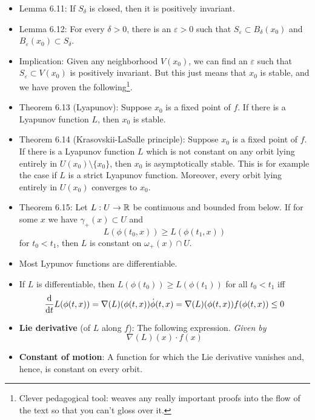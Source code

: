 \documentclass[../notes.tex]{subfiles}
\begin{document}
\begin{itemize}
    \item Lemma 6.11: If $S_\delta$ is closed, then it is positively invariant.
    \item Lemma 6.12: For every $\delta>0$, there is an $\varepsilon>0$ such that $S_\varepsilon\subset B_\delta(x_0)$ and $B_\varepsilon(x_0)\subset S_\delta$.
    \item Implication: Given any neighborhood $V(x_0)$, we can find an $\varepsilon$ such that $S_\varepsilon\subset V(x_0)$ is positively invariant. But this just means that $x_0$ is stable, and we have proven the following\footnote{Clever pedagogical tool: \textcite{bib:Teschl} weaves any really important proofs into the flow of the text so that you can't gloss over it.}.
    \item Theorem 6.13 (Lyapunov): Suppose $x_0$ is a fixed point of $f$. If there is a Lyapunov function $L$, then $x_0$ is stable.
    \item Theorem 6.14 (Krasovskii-LaSalle principle): Suppose $x_0$ is a fixed point of $f$. If there is a Lyapunov function $L$ which is not constant on any orbit lying entirely in $U(x_0)\setminus\{x_0\}$, then $x_0$ is asymptotically stable. This is for example the case if $L$ is a strict Lyapunov function. Moreover, every orbit lying entirely in $U(x_0)$ converges to $x_0$.
    \item Theorem 6.15: Let $L:U\to\mathbb{R}$ be continuous and bounded from below. If for some $x$ we have $\gamma_+(x)\subset U$ and
    \begin{equation*}
        L(\phi(t_0,x)) \geq L(\phi(t_1,x))
    \end{equation*}
    for $t_0<t_1$, then $L$ is constant on $\omega_+(x)\cap U$.
    \item Most Lypunov functions are differentiable.
    \item If $L$ is differentiable, then $L(\phi(t_0))\geq L(\phi(t_1))$ for all $t_0<t_1$ iff
    \begin{equation*}
        \dv{t}L(\phi(t,x)) = \nabla(L)(\phi(t,x))\dot{\phi}(t,x)
        = \nabla(L)(\phi(t,x))f(\phi(t,x))
        \leq 0
    \end{equation*}
    \item \textbf{Lie derivative} (of $L$ along $f$): The following expression. \emph{Given by}
    \begin{equation*}
        \nabla(L)(x)\cdot f(x)
    \end{equation*}
    \item \textbf{Constant of motion}: A function for which the Lie derivative vanishes and, hence, is constant on every orbit.

\end{itemize}
\end{document}
